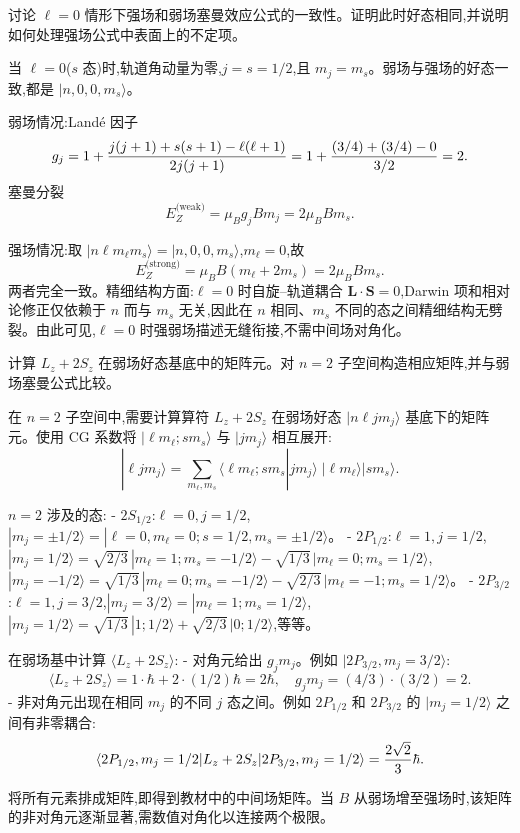 \begin{question}
讨论 $\ell=0$ 情形下强场和弱场塞曼效应公式的一致性。证明此时好态相同,并说明如何处理强场公式中表面上的不定项。
\begin{solution}
当 $\ell=0$($s$ 态)时,轨道角动量为零,$j=s=1/2$,且 $m_j=m_s$。弱场与强场的好态一致,都是 $|n,0,0,m_s\rangle$。

弱场情况:Land\'e 因子
\[
g_j = 1+{j(j+1)+s(s+1)-\ell(\ell+1)\over2j(j+1)}
= 1+{(3/4)+(3/4)-0\over3/2}=2.
\]
塞曼分裂
\[
E_Z^{\text{(weak)}} = \mu_B g_j B m_j = 2\mu_B B m_s.
\]

强场情况:取 $|n\ell m_\ell m_s\rangle = |n,0,0,m_s\rangle$,$m_\ell=0$,故
\[
E_Z^{\text{(strong)}} = \mu_B B(m_\ell+2m_s) = 2\mu_B B m_s.
\]
两者完全一致。精细结构方面:$\ell=0$ 时自旋--轨道耦合 $\mathbf L\cdot\mathbf S=0$,Darwin 项和相对论修正仅依赖于 $n$ 而与 $m_s$ 无关,因此在 $n$ 相同、$m_s$ 不同的态之间精细结构无劈裂。由此可见,$\ell=0$ 时强弱场描述无缝衔接,不需中间场对角化。
\end{solution}
\end{question}

\begin{question}
计算 $L_z+2S_z$ 在弱场好态基底中的矩阵元。对 $n=2$ 子空间构造相应矩阵,并与弱场塞曼公式比较。
\begin{solution}
在 $n=2$ 子空间中,需要计算算符 $L_z+2S_z$ 在弱场好态 $|n\ell j m_j\rangle$ 基底下的矩阵元。使用 CG 系数将 $|\ell m_\ell; s m_s\rangle$ 与 $|j m_j\rangle$ 相互展开:
\[
|\ell j m_j\rangle = \sum_{m_\ell,m_s} \langle \ell m_\ell; s m_s|j m_j\rangle\; |\ell m_\ell\rangle|s m_s\rangle.
\]

$n=2$ 涉及的态:
- $2S_{1/2}$:$\ell=0,j=1/2$,$|m_j=\pm1/2\rangle = |\ell=0,m_\ell=0; s=1/2,m_s=\pm1/2\rangle$。
- $2P_{1/2}$:$\ell=1,j=1/2$,$|m_j=1/2\rangle = \sqrt{2/3}\,|m_\ell=1;m_s=-1/2\rangle - \sqrt{1/3}\,|m_\ell=0;m_s=1/2\rangle$,$|m_j=-1/2\rangle = \sqrt{1/3}\,|m_\ell=0;m_s=-1/2\rangle - \sqrt{2/3}\,|m_\ell=-1;m_s=1/2\rangle$。
- $2P_{3/2}$:$\ell=1,j=3/2$,$|m_j=3/2\rangle=|m_\ell=1;m_s=1/2\rangle$,$|m_j=1/2\rangle = \sqrt{1/3}\,|1;1/2\rangle+\sqrt{2/3}\,|0;1/2\rangle$,等等。

在弱场基中计算 $\langle L_z+2S_z\rangle$:
- 对角元给出 $g_j m_j$。例如 $|2P_{3/2},m_j=3/2\rangle$:
  \[
  \langle L_z+2S_z\rangle = 1\cdot\hbar + 2\cdot(1/2)\hbar = 2\hbar,\quad
  g_j m_j = (4/3)\cdot(3/2)=2.
  \]
- 非对角元出现在相同 $m_j$ 的不同 $j$ 态之间。例如 $2P_{1/2}$ 和 $2P_{3/2}$ 的 $|m_j=1/2\rangle$ 之间有非零耦合:
  \[
  \langle 2P_{1/2},m_j=1/2|L_z+2S_z|2P_{3/2},m_j=1/2\rangle = {2\sqrt2\over3}\hbar.
  \]

将所有元素排成矩阵,即得到教材中的中间场矩阵。当 $B$ 从弱场增至强场时,该矩阵的非对角元逐渐显著,需数值对角化以连接两个极限。
\end{solution}
\end{question}

